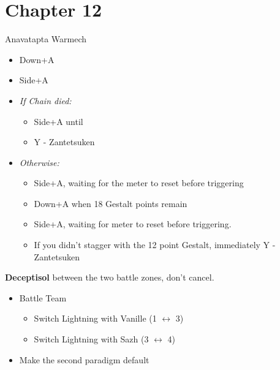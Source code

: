 \chapter{Chapter 12}

\begin{battle}[0:27]{Anavatapta Warmech}
	\begin{itemize}
		\item Down+A
		\item Side+A
		\item \textit{If Chain died:}
		      \begin{itemize}
			      \item Side+A until \stagger
			      \item Y - Zantetsuken
		      \end{itemize}
		\item \textit{Otherwise:}
		      \begin{itemize}
			      \item Side+A, waiting for the meter to reset before triggering
			      \item Down+A when 18 Gestalt points remain
			      \item Side+A, waiting for meter to reset before triggering.
			      \item If you didn't stagger with the 12 point Gestalt, immediately Y - Zantetsuken
		      \end{itemize}
	\end{itemize}
\end{battle}


\textbf{Deceptisol} between the two battle zones, don't cancel.

\begin{menu}
	\begin{itemize}
		\paradigm
		\begin{itemize}
			\item Battle Team
			      \begin{itemize}
				      \item Switch Lightning with Vanille (1 $\leftrightarrow$ 3)
				      \item Switch Lightning with Sazh (3 $\leftrightarrow$ 4)
			      \end{itemize}
			\item Make the second paradigm default
		\end{itemize}
	\end{itemize}
\end{menu}

